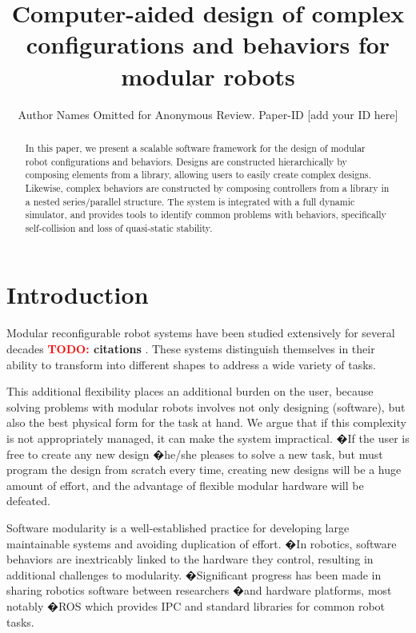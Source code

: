\documentclass[conference]{IEEEtran}
\theoremstyle{definition}
\newcommand{\TODO}[1]{ {\bf \textcolor{red}{TODO:} #1 }}
\begin{document}
\title{Computer-aided design of complex configurations and behaviors for modular robots}

\author{Author Names Omitted for Anonymous Review. Paper-ID [add your ID here]}

\maketitle

\begin{abstract}
In this paper, we present a scalable software framework for the design of modular robot configurations and behaviors. Designs are constructed hierarchically by composing elements from a library, allowing users to easily create complex designs.  Likewise, complex behaviors are constructed by composing controllers from a library in a nested series/parallel structure. The system is integrated with a full dynamic simulator, and provides tools to identify common problems with behaviors, specifically self-collision and loss of quasi-static stability.

\end{abstract}

\section{Introduction}
Modular reconfigurable robot systems have been studied extensively for several decades \TODO{citations}.  These systems distinguish themselves in their ability to transform into different shapes to address a wide variety of tasks.

This additional flexibility places an additional burden on the user, because solving problems with modular robots involves not only designing  (software),
but also the best physical form for the task at hand. We argue that if this
complexity is not appropriately managed, it can make the system
impractical. �If the user is free to create any new design �he/she pleases to
solve a new task, but must program the design from scratch every time, creating
new designs will be a huge amount of effort, and the advantage of flexible modular
hardware will be defeated.

Software modularity is a well-established practice for developing large
maintainable systems and avoiding duplication of effort. �In robotics, software
behaviors are inextricably linked to the hardware they control, resulting in
additional challenges to modularity. �Significant progress has been made in
sharing robotics software between researchers
�and hardware platforms, most notably
�ROS which provides IPC and standard libraries for common robot tasks. 
\end{document}
